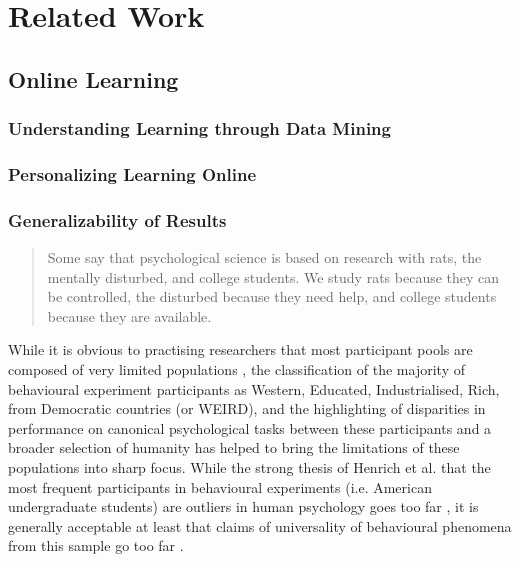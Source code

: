 \documentclass[12pt,a4paper,titlepage]{scrreprt}
\begin{document}
\newpage

\chapter{Related Work}
\section{Online Learning}
\subsection{Understanding Learning through Data Mining}

\subsection{Personalizing Learning Online}

\subsection{Generalizability of Results}
\begin{quote}Some say that psychological science is based on research with rats, the mentally disturbed, and college students. We study rats because they can be controlled, the disturbed because they need help, and college students because they are available. \parencite{birnbaum_psychological_2000}
\end{quote}
While it is obvious to practising researchers that most participant pools are composed of very limited populations \parencite{buchanan_using_1999,birnbaum_psychological_2000,kraut_psychological_2004,birnbaum_human_2004,buhrmester_amazons_2011}, the classification of the majority of behavioural experiment participants as Western, Educated, Industrialised, Rich, from Democratic countries (or WEIRD), and the highlighting of disparities in performance on canonical psychological tasks between these participants and a broader selection of humanity  \parencite{henrich_beyond_2010} has helped to bring the limitations of these populations into sharp focus. While the strong thesis of Henrich et al. that the most frequent participants in behavioural experiments (i.e. American undergraduate students) are outliers in human psychology goes too far \parencite{bennis_weirdness_2010}, it is generally acceptable at least that claims of universality of behavioural phenomena from this sample go too far \parencite{baumard_weird_2010,ceci_weird_2010,konecni_responsible_2010}.
\end{document}
